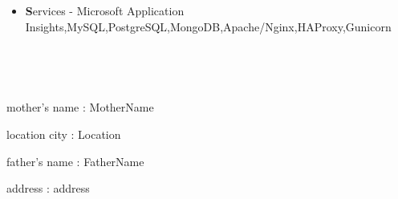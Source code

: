 \documentclass[a4paper,10pt]{article}
\newcommand{\lsep}{-0.5cm}
\begin{document}
\begin{itemize}
\item \noindent \textbf Services - Microsoft Application Insights,MySQL,PostgreSQL,MongoDB,Apache/Nginx,HAProxy,Gunicorn
\end{itemize}





\\[\lsep]






\\[\lsep]

\begin{itemize}
   mother's name : MotherName
\end{itemize}

\begin{itemize}
   location city : Location
\end{itemize}

\begin{itemize}
   father's name : FatherName
\end{itemize}

\begin{itemize}
   address : address
\end{itemize}
\end{document}

